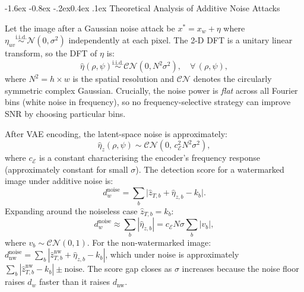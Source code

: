 \documentclass[10pt,twocolumn]{article}
\makeatletter
\renewcommand\subsection{\@startsection{subsection}{2}{\z@}%
  {-1.6ex \@plus -0.8ex \@minus -.2ex}{0.4ex \@plus .1ex}%
  {\normalfont\normalsize\itshape}}
\makeatother
\begin{document}
\subsection{Theoretical Analysis of Additive Noise Attacks}
\label{sec:theory_noise}

Let the image after a Gaussian noise attack be $x^* = x_w + \eta$
where $\eta_{uv} \overset{\mathrm{i.i.d.}}{\sim} \mathcal{N}(0, \sigma^2)$
independently at each pixel.
The 2-D DFT is a unitary linear transform, so the DFT of $\eta$ is:
\begin{equation}
  \hat{\eta}(\rho, \psi)
    \overset{\mathrm{i.i.d.}}{\sim} \mathcal{CN}(0, N^2\sigma^2),
  \quad \forall\, (\rho, \psi),
\end{equation}
where $N^2 = h \times w$ is the spatial resolution and
$\mathcal{CN}$ denotes the circularly symmetric complex Gaussian.
Crucially, the noise power is \emph{flat} across all Fourier bins
(white noise in frequency), so no frequency-selective strategy can
improve SNR by choosing particular bins.

After VAE encoding, the latent-space noise is approximately:
\begin{equation}
  \hat{\eta}_z(\rho, \psi) \sim \mathcal{CN}(0,\, c_{\mathcal{E}}^2 N^2 \sigma^2),
\end{equation}
where $c_{\mathcal{E}}$ is a constant characterising the encoder's
frequency response (approximately constant for small $\sigma$).
The detection score for a watermarked image under additive noise is:
\begin{equation}
  d_w^{\text{noise}} = \sum_b
    \bigl|\hat{z}_{T,b} + \hat{\eta}_{z,b} - k_b\bigr|.
\end{equation}
Expanding around the noiseless case $\hat{z}_{T,b} = k_b$:
\begin{equation}
  d_w^{\text{noise}} \approx \sum_b |\hat{\eta}_{z,b}|
    = c_{\mathcal{E}} N \sigma \sum_b |v_b|,
\end{equation}
where $v_b \sim \mathcal{CN}(0,1)$.
For the non-watermarked image: $d_{\mathrm{nw}}^{\text{noise}} = \sum_b |\hat{z}_{T,b}^{\mathrm{nw}} + \hat{\eta}_{z,b} - k_b|$,
which under noise is approximately $\sum_b |\hat{z}_{T,b}^{\mathrm{nw}} - k_b| \pm \text{noise}$.
The score gap closes as $\sigma$ increases because the noise floor
raises $d_w$ faster than it raises $d_{\mathrm{nw}}$.
\end{document}
